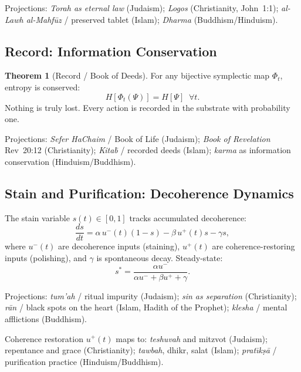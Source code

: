 \documentclass[12pt,oneside]{book}
\theoremstyle{definition}
\newtheorem{theorem}{Theorem}[chapter]
\begin{document}
\noindent Projections: \textit{Torah as eternal law} (Judaism); \textit{Logos}
(Christianity, John~1:1); \textit{al-Lawh al-Mahf\={u}z} / preserved tablet
(Islam); \textit{Dharma} (Buddhism/Hinduism).

\subsection{Record: Information Conservation}

\begin{theorem}[Record / Book of Deeds]
  For any bijective symplectic map $\Phi_t$, entropy is conserved:
  \begin{equation}
    H[\Phi_t(\Psi)] = H[\Psi] \;\;\forall t.
  \end{equation}
  Nothing is truly lost. Every action is recorded in the substrate with probability one.
\end{theorem}

\noindent Projections: \textit{Sefer HaChaim} / Book of Life (Judaism);
\textit{Book of Revelation} Rev~20:12 (Christianity); \textit{Kita\={b}} /
recorded deeds (Islam); \textit{karma} as information conservation (Hinduism/Buddhism).

\subsection{Stain and Purification: Decoherence Dynamics}

The stain variable $s(t) \in [0,1]$ tracks accumulated decoherence:
\begin{equation}
  \label{eq:stain}
  \frac{ds}{dt} = \alpha\,u^-(t)(1-s) - \beta\,u^+(t)s - \gamma s,
\end{equation}
where $u^-(t)$ are decoherence inputs (staining), $u^+(t)$ are coherence-restoring
inputs (polishing), and $\gamma$ is spontaneous decay. Steady-state:
\begin{equation}
  s^* = \frac{\alpha u^-}{\alpha u^- + \beta u^+ + \gamma}.
\end{equation}

\noindent Projections: \textit{tum'ah} / ritual impurity (Judaism);
\textit{sin as separation} (Christianity); \textit{r\={a}n} / black spots on the
heart (Islam, Hadith of the Prophet); \textit{klesha} / mental afflictions (Buddhism).

Coherence restoration $u^+(t)$ maps to: \textit{teshuvah} and mitzvot (Judaism);
repentance and grace (Christianity); \textit{tawbah}, dhikr, salat (Islam);
\textit{prat\={\i}k\d{s}\={a}} / purification practice (Hinduism/Buddhism).
\end{document}
